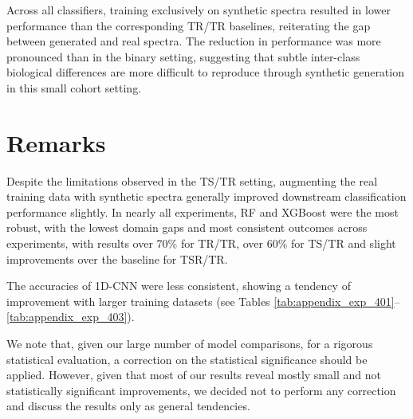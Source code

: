 Across all classifiers, training exclusively on synthetic spectra resulted in lower performance than the corresponding TR/TR baselines, reiterating the gap between generated and real spectra. The reduction in performance was more pronounced than in the binary setting, suggesting that subtle inter-class biological differences are more difficult to reproduce through synthetic generation in this small cohort setting.

\section{Remarks}
Despite the limitations observed in the TS/TR setting, augmenting the real training data with synthetic spectra generally improved downstream classification performance slightly. In nearly all experiments, RF and XGBoost were the most robust, with the lowest domain gaps and most consistent outcomes across experiments, with results over 70\% for TR/TR, over 60\% for TS/TR and slight improvements over the baseline for TSR/TR.

The accuracies of 1D-CNN were less consistent, showing a tendency of improvement with larger training datasets (see Tables \ref{tab:appendix_exp_401}--\ref{tab:appendix_exp_403}).

We note that, given our large number of model comparisons, for a rigorous statistical evaluation, a correction on the statistical significance should be applied. However, given that most of our results reveal mostly small and not statistically significant improvements, we decided not to perform any correction and discuss the results only as general tendencies.
